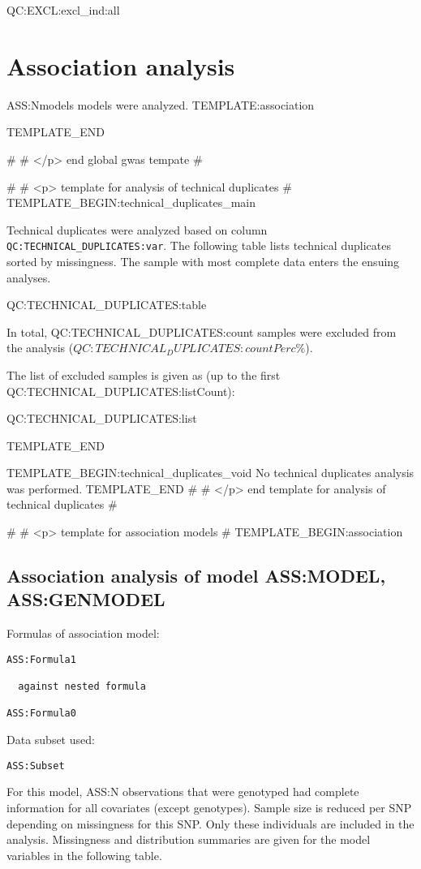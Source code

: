 QC:EXCL:excl_ind:all

\section{Association analysis}
ASS:Nmodels models were analyzed.
TEMPLATE:association

TEMPLATE_END

#
#	</p> end global gwas tempate
#

#
#	<p> template for analysis of technical duplicates
#
TEMPLATE_BEGIN:technical_duplicates_main

Technical duplicates were analyzed based on column \texttt{QC:TECHNICAL_DUPLICATES:var}. The following table lists technical duplicates sorted by missingness. The sample with most complete data enters the ensuing analyses. 

QC:TECHNICAL_DUPLICATES:table

In total, QC:TECHNICAL_DUPLICATES:count samples were excluded from the analysis ($QC:TECHNICAL_DUPLICATES:countPerc\%$).

The list of excluded samples is given as (up to the first QC:TECHNICAL_DUPLICATES:listCount):\par

{\tiny
	QC:TECHNICAL_DUPLICATES:list
}\par

TEMPLATE_END

TEMPLATE_BEGIN:technical_duplicates_void
No technical duplicates analysis was performed.
TEMPLATE_END
#
#	</p> end template for analysis of technical duplicates
#

#
#	<p> template for association models
#
TEMPLATE_BEGIN:association
\subsection{Association analysis of model ASS:MODEL, ASS:GENMODEL}

Formulas of association model:
\begin{verbatim}
ASS:Formula1

  against nested formula

ASS:Formula0
\end{verbatim}
Data subset used:
\begin{verbatim}
ASS:Subset
\end{verbatim}

For this model, ASS:N observations that were genotyped had complete information for all covariates (except genotypes). Sample size is reduced per SNP depending on missingness for this SNP. Only these individuals are included in the analysis. Missingness and distribution summaries are given for the model variables in the following table.

